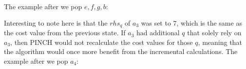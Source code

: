 The example after we pop $e,f,g,b$:
\begin{center}
\end{center}
Interesting to note here is that the $rhs_q$ of $a_3$ was set to 7, which is the same as the cost value from the previous state. If $a_3$ had additional $q$ that solely rely on $a_3$, then PINCH would not recalculate the cost values for those $q$, meaning that the algorithm would once more benefit from the incremental calculations.
\newpage
The example after we pop $a_4$:
\begin{center}
\end{center}
